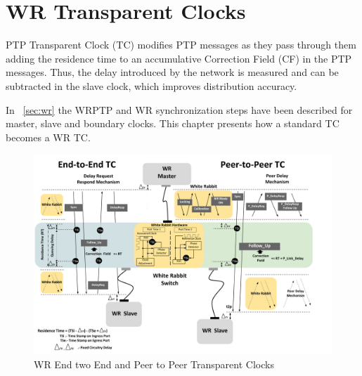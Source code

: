 \section{WR Transparent Clocks}
\label{sec:wr_tc}
PTP Transparent Clock (TC) modifies PTP messages as they pass through them
adding the residence time to an accumulative Correction Field (CF) in the PTP 
messages. Thus, the delay introduced  by the network is measured and can be 
subtracted in the slave clock, which improves distribution accuracy.

In ~\ref{sec:wr} the WRPTP and WR synchronization steps have been described for
master, slave and boundary clocks. This chapter presents how a standard TC becomes a WR TC.

\begin{figure}[!t]
\centering
\includegraphics[scale=0.27]{fig/wr_schema_hw_bw.png}
\caption{WR End two End and Peer to Peer Transparent Clocks}
\label{fig:wr_tc}
\end{figure}

%
%
%
%
%
